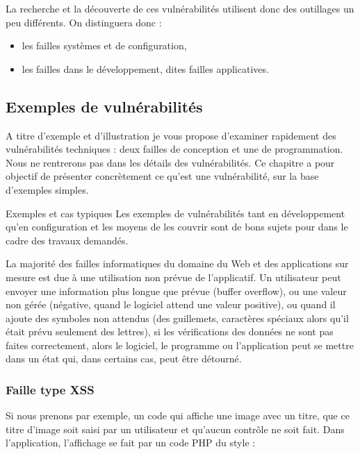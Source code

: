 La recherche et la découverte de ces vulnérabilités utilisent donc des outillages un peu différents. On distinguera donc : 

\begin{itemize}
  \item les failles systèmes et de configuration,
  \item les failles dans le développement, dites failles applicatives.
 \end{itemize}

\subsection{Exemples de vulnérabilités}

A titre d'exemple et d'illustration je vous propose d'examiner rapidement des vulnérabilités techniques : deux failles de conception  et  une de programmation.
Nous ne rentrerons pas dans les détails des vulnérabilités. Ce chapitre a pour objectif de présenter concrètement ce qu'est une vulnérabilité, sur la base d'exemples simples.

\begin{techworkbox}{Exemples et cas typiques}
Les exemples de vulnérabilités tant en développement qu'en configuration et les moyens de les couvrir sont de bons sujets pour \fichetech  dans le cadre des travaux demandés.
\end{techworkbox}


La  majorité des failles informatiques du domaine du Web et des applications sur mesure est due à une utilisation non prévue de l'applicatif. Un utilisateur peut envoyer une information plus longue que prévue (buffer overflow), ou une valeur non gérée (négative, quand le logiciel attend une valeur positive), ou quand il ajoute des symboles non attendus (des guillemets, caractères spéciaux alors qu'il était prévu seulement des lettres), si les vérifications des données ne sont pas faites correctement, alors le logiciel, le programme ou l’application peut se mettre dans un état qui, dans certains cas, peut être détourné.

\subsubsection{Faille type XSS}

Si nous prenons par exemple, un code qui affiche une image avec un titre, que ce titre d'image soit saisi par un utilisateur et qu'aucun contrôle ne soit fait. Dans l'application, l'affichage se fait par un code PHP du style : \\


